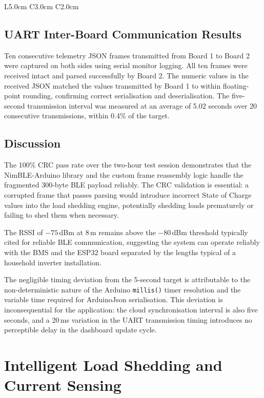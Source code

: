 \documentclass[12pt, a4paper]{report}
\begin{document}
{\begin{longtable}{L{5.0cm} C{3.0cm} C{2.0cm}}
\end{longtable}

\subsection{UART Inter-Board Communication Results}

Ten consecutive telemetry JSON frames transmitted from Board 1 to Board 2
were captured on both sides using serial monitor logging. All ten frames
were received intact and parsed successfully by Board 2. The numeric
values in the received JSON matched the values transmitted by Board 1 to
within floating-point rounding, confirming correct serialisation and
deserialisation. The five-second transmission interval was measured at an
average of 5.02 seconds over 20 consecutive transmissions, within 0.4\%
of the target.

\subsection{Discussion}

The 100\% CRC pass rate over the two-hour test session demonstrates that
the NimBLE-Arduino library and the custom frame reassembly logic handle
the fragmented 300-byte BLE payload reliably. The CRC validation is
essential: a corrupted frame that passes parsing would introduce incorrect
State of Charge values into the load shedding engine, potentially shedding
loads prematurely or failing to shed them when necessary.

The RSSI of $-75$\,dBm at 8\,m remains above the $-80$\,dBm threshold
typically cited for reliable BLE communication, suggesting the system
can operate reliably with the BMS and the ESP32 board separated by the
lengths typical of a household inverter installation.

The negligible timing deviation from the 5-second target is attributable
to the non-deterministic nature of the Arduino \texttt{millis()} timer
resolution and the variable time required for ArduinoJson serialisation.
This deviation is inconsequential for the application: the cloud
synchronisation interval is also five seconds, and a 20\,ms variation in
the UART transmission timing introduces no perceptible delay in the
dashboard update cycle.

\section{Intelligent Load Shedding and Current Sensing}

}
\end{document}
